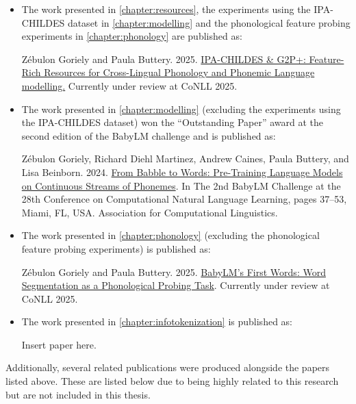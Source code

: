\begin{itemize}
\item The work presented in \cref{chapter:resources}, the experiments using the IPA-CHILDES dataset in \cref{chapter:modelling} and the phonological feature probing experiments in \cref{chapter:phonology} are published as:

\begin{mdframed}[linewidth=1pt]
Zébulon Goriely and Paula Buttery. 2025. \href{https://arxiv.org/abs/2504.03036}{IPA-CHILDES \& G2P+: Feature-Rich Resources for Cross-Lingual Phonology and Phonemic Language modelling.} Currently under review at CoNLL 2025.
\end{mdframed}

\item The work presented in \cref{chapter:modelling} (excluding the experiments using the IPA-CHILDES dataset) won the ``Outstanding Paper'' award at the second edition of the BabyLM challenge and is published as:

\begin{mdframed}[linewidth=1pt]
Zébulon Goriely, Richard Diehl Martinez, Andrew Caines, Paula Buttery, and Lisa Beinborn. 2024. \href{https://aclanthology.org/2024.conll-babylm.4/#}{From Babble to Words: Pre-Training Language Models on Continuous Streams of Phonemes}. In The 2nd BabyLM Challenge at the 28th Conference on Computational Natural Language Learning, pages 37–53, Miami, FL, USA. Association for Computational Linguistics.
\end{mdframed}

\item The work presented in \cref{chapter:phonology} (excluding the phonological feature probing experiments) is published as:
\begin{mdframed}[linewidth=1pt]
Zébulon Goriely and Paula Buttery. 2025. \href{https://arxiv.org/abs/2504.03338}{BabyLM's First Words: Word Segmentation as a Phonological Probing Task}. Currently under review at CoNLL 2025.
\end{mdframed}

\item The work presented in \cref{chapter:infotokenization} is published as:
\begin{mdframed}[linewidth=1pt]
Insert paper here.
\end{mdframed}
\end{itemize}

Additionally, several related publications were produced alongside the papers listed above. These are listed below due to being highly related to this research but are not included in this thesis.

